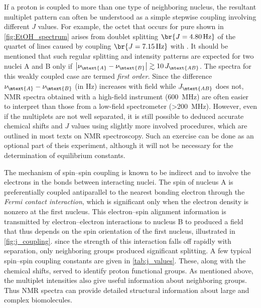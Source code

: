 \documentclass[nobib,nofonts,nols,nohyper]{tufte-handout}
\begin{document}
If a proton is coupled to more than one type of neighboring nucleus, the resultant multiplet pattern can often be understood as a simple stepwise coupling involving different \( J \) values.
For example, the  octet that occurs for pure  shown in \cref{fig:EtOH_spectrum} arises from  doublet splitting \( \br{J = \SI{4.80}{\Hz}} \) of the quartet of lines caused by coupling \( \br{J = \SI{7.15}{\Hz}} \) with . 
It should be mentioned that such regular splitting and intensity patterns are expected for two nuclei A and B only if \( \abs{\nu_\mtext{A} - \nu_\mtext{B}} \gtrsim 10\,J_\mtext{AB} \). 
The spectra for this weakly coupled case are termed \emph{first order.}
Since the difference \( \nu_\mtext{A} - \nu_\mtext{B} \) (in \si{\Hz}) increases with field while \( J_\mtext{AB} \) does not, NMR spectra obtained with a high-field instrument (\SI{600}{\MHz}) are often easier to interpret than those from a low-field spectrometer (\SI{>200}{\MHz}). 
However, even if the multiplets are not well separated, it is still possible to deduced accurate chemical shifts and \( J \) values using slightly more involved procedures, which are outlined in most texts on NMR spectroscopy.\autocite{davis1965advanced,pople1959nmr,silverstein2005spec,burdett1964a,rogers1956a}
Such an exercise can be done as an optional part of theis experiment, although it will not be necessary for the determination of equilibrium constants. 

The mechanism of spin--spin coupling is known to be indirect and to involve the electrons in the bonds between interacting nuclei. 
The spin of nucleus A is preferentially coupled antiparallel to the nearest bonding electron through the \emph{Fermi contact interaction}, which is significant only when the electron density is nonzero at the first nucleus.
This electron--spin alignment information is transmitted by electron--electron interactions to nucleus B to produced a field that thus depends on the spin orientation of the first nucleus, illustrated in \cref{fig:j_coupling}. 
since the strength of this interaction falls off rapidly with separation, only neighboring groups produced significant splitting. 
A few typical spin--spin coupling constants are given in \cref{tab:j_values}. 
These, along with the chemical shifts, served to identify proton functional groups. 
As mentioned above, the multiplet intensities also give useful information about neighboring groups. 
Thus NMR spectra can provide detailed structural information about large and complex biomolecules. 
\end{document}
